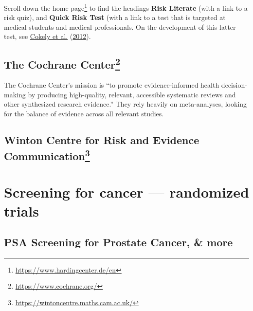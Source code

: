 \documentclass[
  10pt,
  b5paper]{book}
\begin{document}
Scroll down the home page\footnote{\url{https://www.hardingcenter.de/en}} to find the
headings \textbf{Risk Literate} (with a link to a risk quiz), and
\textbf{Quick Risk Test} (with a link to a test that is targeted at medical
students and medical professionals. On the development of this latter
test, see \protect\hyperlink{ref-cokely2012measuring}{Cokely et al.} (\protect\hyperlink{ref-cokely2012measuring}{2012}).

\hypertarget{the-cochrane-center}{%
\subsection*{\texorpdfstring{The Cochrane Center\footnote{\url{https://www.cochrane.org/}}}{The Cochrane Center}}\label{the-cochrane-center}}

The Cochrane Center's mission is ``to promote evidence-informed health decision-making by producing high-quality, relevant, accessible systematic
reviews and other synthesized research evidence.'' They rely heavily on
meta-analyses, looking for the balance of evidence across all relevant
studies.

\hypertarget{winton-centre-for-risk-and-evidence-communication}{%
\subsection*{\texorpdfstring{Winton Centre for Risk and Evidence Communication\footnote{\url{https://wintoncentre.maths.cam.ac.uk/}}}{Winton Centre for Risk and Evidence Communication}}\label{winton-centre-for-risk-and-evidence-communication}}

\hypertarget{screening-for-cancer-randomized-trials}{%
\section{Screening for cancer --- randomized trials}\label{screening-for-cancer-randomized-trials}}

\hypertarget{psa-screening-for-prostate-cancer-more}{%
\subsection*{PSA Screening for Prostate Cancer, \& more}\label{psa-screening-for-prostate-cancer-more}}
\end{document}

